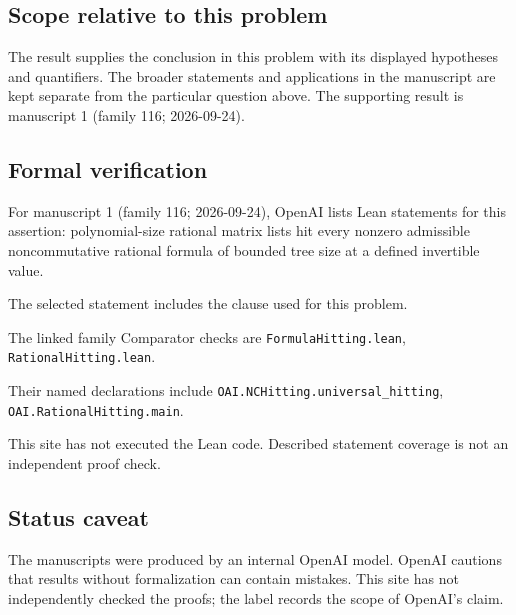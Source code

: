 \documentclass[11pt]{article}
\begin{document}
\subsection{Scope relative to this problem}
The result supplies the conclusion in this problem with its displayed hypotheses and quantifiers. The broader statements and applications in the manuscript are kept separate from the particular question above. The supporting result is manuscript 1 (family 116; 2026-09-24).

\subsection{Formal verification}
For manuscript 1 (family 116; 2026-09-24), OpenAI lists Lean statements for this assertion: polynomial-size rational matrix lists hit every nonzero admissible noncommutative rational formula of bounded tree size at a defined invertible value.

The selected statement includes the clause used for this problem.

The linked family Comparator checks are \texttt{FormulaHitting.lean}, \texttt{RationalHitting.lean}.

Their named declarations include \texttt{OAI.NCHitting.universal\_hitting}, \texttt{OAI.RationalHitting.main}.

This site has not executed the Lean code. Described statement coverage is not an independent proof check.

\subsection{Status caveat}
The manuscripts were produced by an internal OpenAI model. OpenAI cautions that results without formalization can contain mistakes. This site has not independently checked the proofs; the label records the scope of OpenAI's claim.
\end{document}
